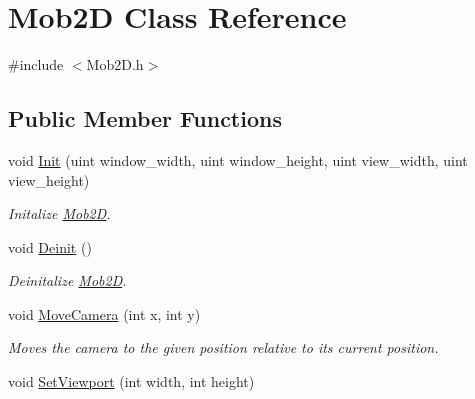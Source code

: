 \hypertarget{classMob2D}{
\section{Mob2D Class Reference}
\label{classMob2D}
}


{\ttfamily \#include $<$Mob2D.h$>$}\subsection*{Public Member Functions}
\begin{DoxyCompactItemize}
\item 
\hypertarget{classMob2D_a403eb2e55eeb9d79f570ed196cc76ef3}{
void \hyperlink{classMob2D_a403eb2e55eeb9d79f570ed196cc76ef3}{Init} (uint window\_\-width, uint window\_\-height, uint view\_\-width, uint view\_\-height)}
\label{classMob2D_a403eb2e55eeb9d79f570ed196cc76ef3}

\begin{DoxyCompactList}\small\item\em Initalize \hyperlink{classMob2D}{Mob2D}. \item\end{DoxyCompactList}\item 
\hypertarget{classMob2D_adf57acf401bce7c9f4d8b9719e817f3c}{
void \hyperlink{classMob2D_adf57acf401bce7c9f4d8b9719e817f3c}{Deinit} ()}
\label{classMob2D_adf57acf401bce7c9f4d8b9719e817f3c}

\begin{DoxyCompactList}\small\item\em Deinitalize \hyperlink{classMob2D}{Mob2D}. \item\end{DoxyCompactList}\item 
\hypertarget{classMob2D_ab149e996732a01d5375d6448dbde8c6c}{
void \hyperlink{classMob2D_ab149e996732a01d5375d6448dbde8c6c}{MoveCamera} (int x, int y)}
\label{classMob2D_ab149e996732a01d5375d6448dbde8c6c}

\begin{DoxyCompactList}\small\item\em Moves the camera to the given position relative to its current position. \item\end{DoxyCompactList}\item 
\hypertarget{classMob2D_a242b8591fe4a653f304852353c3a8811}{
void \hyperlink{classMob2D_a242b8591fe4a653f304852353c3a8811}{SetViewport} (int width, int height)}
\label{classMob2D_a242b8591fe4a653f304852353c3a8811}


\end{DoxyCompactItemize}
